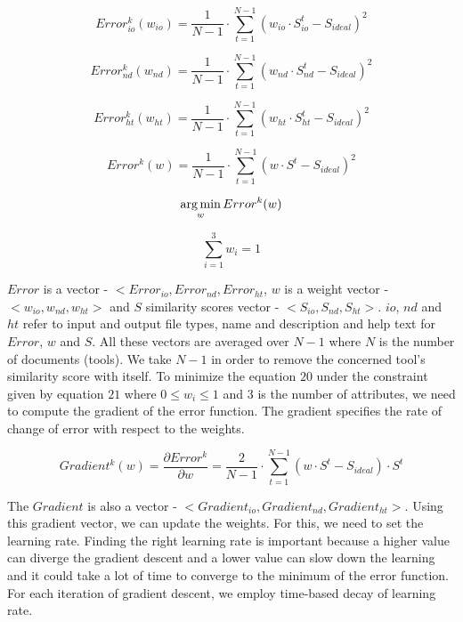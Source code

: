 \begin{equation}
Error^k_{io}(w_{io}) = \frac{1}{N - 1} \cdot \sum_{t=1}^{N-1} (w_{io} \cdot S^t_{io} - S_{ideal}) ^ 2
\end{equation}

\begin{equation}
Error^k_{nd}(w_{nd}) = \frac{1}{N - 1} \cdot \sum_{t=1}^{N-1} (w_{nd} \cdot S^t_{nd} - S_{ideal}) ^ 2
\end{equation}

\begin{equation}
Error^k_{ht}(w_{ht}) =  \frac{1}{N - 1} \cdot \sum_{t=1}^{N-1} (w_{ht} \cdot S^t_{ht} - S_{ideal}) ^ 2
\end{equation}

\begin{equation}
Error^k(w) =  \frac{1}{N - 1} \cdot \sum_{t=1}^{N-1} (w \cdot S^t - S_{ideal}) ^ 2
\end{equation}

\begin{equation}
\operatorname*{arg\,min}_w Error^k(w) 
\end{equation}

\begin{equation}
\sum_{i=1}^{3} w_i = 1
\end{equation}

$Error$ is a vector - $<Error_{io}, Error_{nd}, Error_{ht}$, $w$ is a weight vector - $<w_{io}, w_{nd}, w_{ht}>$ and $S$ similarity scores vector - $<S_{io}, S_{nd}, S_{ht}>$. $io$, $nd$ and $ht$ refer to input and output file types, name and description and help text for $Error$, $w$ and $S$. All these vectors are averaged over $N-1$ where $N$ is the number of documents (tools). We take $N-1$ in order to remove the concerned tool's similarity score with itself. To minimize the equation $20$ under the constraint given by equation $21$ where $0 \leq w_i \leq 1$ and $3$ is the number of attributes, we need to compute the gradient of the error function. The gradient specifies the rate of change of error with respect to the weights.

\begin{equation}
Gradient^k(w) = \frac{\partial Error^k}{\partial w} =  \frac{2}{N - 1} \cdot \sum_{t=1}^{N-1} (w \cdot S^t - S_{ideal}) \cdot S^t
\end{equation}

The $Gradient$ is also a vector - $<Gradient_{io}, Gradient_{nd}, Gradient_{ht}>$. Using this gradient vector, we can update the weights. For this, we need to set the learning rate. Finding the right learning rate is important because a higher value can diverge the gradient descent and a lower value can slow down the learning and it could take a lot of time to converge to the minimum of the error function. For each iteration of gradient descent, we employ time-based decay of learning rate.

